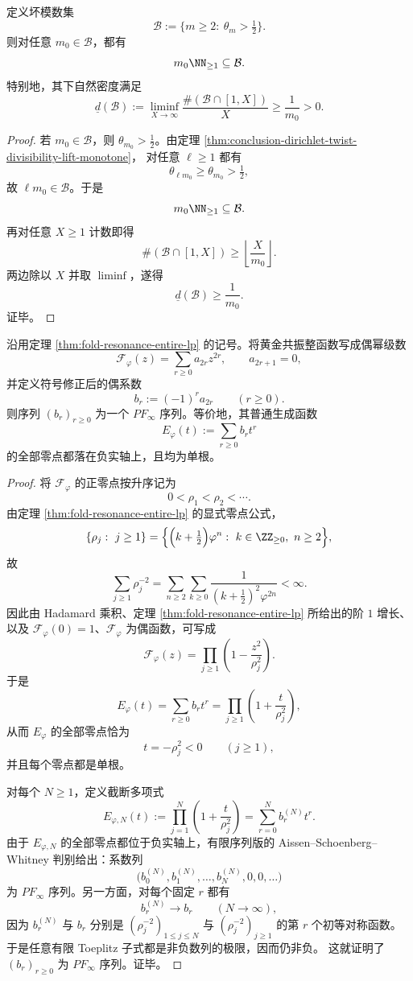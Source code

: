 \begin{corollary}[仅由整除传播便可推出坏模数集的正下密度]\label{cor:conclusion-dirichlet-bad-moduli-positive-lower-density-by-divisibility}
定义坏模数集
\[
\mathcal B:=\{m\ge 2:\ \theta_m>\tfrac12\}.
\]
则对任意 \(m_0\in\mathcal B\)，都有
\[
m_0\NN_{\ge 1}\subseteq \mathcal B.
\]
特别地，其下自然密度满足
\[
\underline d(\mathcal B)
:=
\liminf_{X\to\infty}\frac{\#(\mathcal B\cap [1,X])}{X}
\ge
\frac{1}{m_0}
>
0.
\]
\end{corollary}
\begin{proof}
若 \(m_0\in\mathcal B\)，则 \(\theta_{m_0}>\tfrac12\)。由定理 \ref{thm:conclusion-dirichlet-twist-divisibility-lift-monotone}，
对任意 \(\ell\ge 1\) 都有
\[
\theta_{\ell m_0}\ge \theta_{m_0}>\tfrac12,
\]
故 \(\ell m_0\in\mathcal B\)。于是
\[
m_0\NN_{\ge 1}\subseteq \mathcal B.
\]
再对任意 \(X\ge 1\) 计数即得
\[
\#(\mathcal B\cap [1,X])
\ge
\left\lfloor \frac{X}{m_0}\right\rfloor.
\]
两边除以 \(X\) 并取 \(\liminf\)，遂得
\[
\underline d(\mathcal B)\ge \frac{1}{m_0}.
\]
证毕。
\end{proof}

\begin{theorem}\label{thm:conclusion-golden-resonance-even-coeff-pf-infty}
沿用定理 \ref{thm:fold-resonance-entire-lp} 的记号。将黄金共振整函数写成偶幂级数
\[
\mathcal F_\varphi(z)=\sum_{r\ge 0}a_{2r}z^{2r},
\qquad
a_{2r+1}=0,
\]
并定义符号修正后的偶系数
\[
b_r:=(-1)^r a_{2r}
\qquad (r\ge 0).
\]
则序列 \((b_r)_{r\ge 0}\) 为一个 \(PF_\infty\) 序列。等价地，其普通生成函数
\[
E_\varphi(t):=\sum_{r\ge 0}b_r t^r
\]
的全部零点都落在负实轴上，且均为单根。
\end{theorem}
\begin{proof}
将 \(\mathcal F_\varphi\) 的正零点按升序记为
\[
0<\rho_1<\rho_2<\cdots.
\]
由定理 \ref{thm:fold-resonance-entire-lp} 的显式零点公式，
\[
\{\rho_j:\ j\ge 1\}
=
\Bigl\{\Bigl(k+\tfrac12\Bigr)\varphi^n:\ k\in\ZZ_{\ge 0},\ n\ge 2\Bigr\},
\]
故
\[
\sum_{j\ge 1}\rho_j^{-2}
=
\sum_{n\ge 2}\sum_{k\ge 0}
\frac{1}{(k+\tfrac12)^2\varphi^{2n}}
<
\infty.
\]
因此由 Hadamard 乘积、定理 \ref{thm:fold-resonance-entire-lp} 所给出的阶 \(1\) 增长、以及 \(\mathcal F_\varphi(0)=1\)、\(\mathcal F_\varphi\) 为偶函数，可写成
\[
\mathcal F_\varphi(z)=\prod_{j\ge 1}\left(1-\frac{z^2}{\rho_j^2}\right).
\]
于是
\[
E_\varphi(t)
=
\sum_{r\ge 0}b_r t^r
=
\prod_{j\ge 1}\left(1+\frac{t}{\rho_j^2}\right),
\]
从而 \(E_\varphi\) 的全部零点恰为
\[
t=-\rho_j^2<0
\qquad (j\ge 1),
\]
并且每个零点都是单根。

对每个 \(N\ge 1\)，定义截断多项式
\[
E_{\varphi,N}(t):=\prod_{j=1}^{N}\left(1+\frac{t}{\rho_j^2}\right)
=
\sum_{r=0}^{N}b_r^{(N)}t^r.
\]
由于 \(E_{\varphi,N}\) 的全部零点都位于负实轴上，有限序列版的 Aissen--Schoenberg--Whitney 判别给出：系数列
\[
\bigl(b_0^{(N)},b_1^{(N)},\dots,b_N^{(N)},0,0,\dots\bigr)
\]
为 \(PF_\infty\) 序列。另一方面，对每个固定 \(r\) 都有
\[
b_r^{(N)}\longrightarrow b_r
\qquad (N\to\infty),
\]
因为 \(b_r^{(N)}\) 与 \(b_r\) 分别是 \((\rho_j^{-2})_{1\le j\le N}\) 与 \((\rho_j^{-2})_{j\ge 1}\) 的第 \(r\) 个初等对称函数。
于是任意有限 Toeplitz 子式都是非负数列的极限，因而仍非负。
这就证明了 \((b_r)_{r\ge 0}\) 为 \(PF_\infty\) 序列。证毕。
\end{proof}

